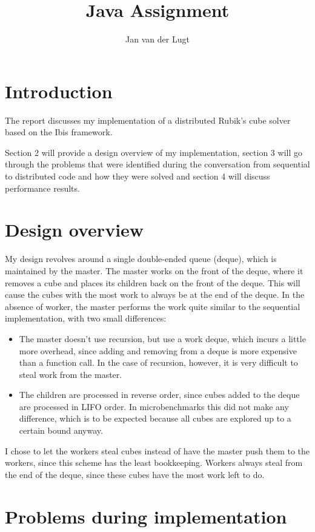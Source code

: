 \documentclass[11pt,a4paper]{article}
\title{Java Assignment}
\author{Jan van der Lugt}
\date{}
\begin{document}
\maketitle

\section{Introduction}
The report discusses my implementation of a distributed Rubik's cube solver based on the Ibis framework.

Section 2 will provide a design overview of my implementation, section 3 will go through the problems that were identified during the conversation from sequential to distributed code and how they were solved and section 4 will discuss performance results.

\section{Design overview}
My design revolves around a single double-ended queue (deque), which is maintained by the master. The master works on the front of the deque, where it removes a cube and places its children back on the front of the deque. This will cause the cubes with the most work to always be at the end of the deque. In the absence of worker, the master performs the work quite similar to the sequential implementation, with two small differences:
\begin{itemize}
\item The master doesn't use recursion, but use a work deque, which incurs a little more overhead, since adding and removing from a deque is more expensive than a function call. In the case of recursion, however, it is very difficult to steal work from the master.
\item The children are processed in reverse order, since cubes added to the deque are processed in LIFO order. In microbenchmarks this did not make any difference, which is to be expected because all cubes are explored up to a certain bound anyway.
\end{itemize}
I chose to let the workers steal cubes instead of have the master push them to the workers, since this scheme has the least bookkeeping. Workers always steal from the end of the deque, since these cubes have the most work left to do.



\section{Problems during implementation}
\end{document}
